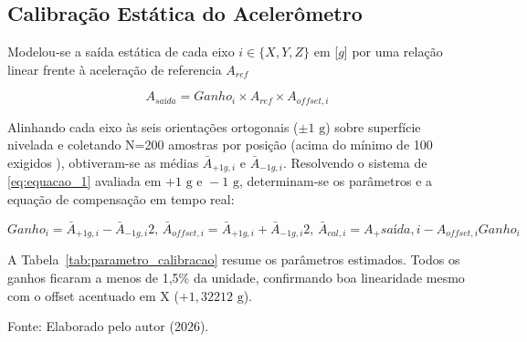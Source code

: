 
\subsection{Calibração Estática do Acelerômetro}
Modelou-se a saída estática de cada eixo $i \in \{X, Y, Z\}$ em [$g$] por uma relação linear frente à aceleração de referencia $A_{ref}$ \cite{4.ochoa2026}

\begin{equation}
    A_{saída} = Ganho_i \times A_{ref} \times A_{offset,i}
    \label{eq:equacao_1}
\end{equation}

Alinhando cada eixo às seis orientações ortogonais ($\pm 1 \text{ g}$) sobre superfície nivelada e coletando N=200 amostras por posição (acima do mínimo de 100 exigidos \cite{4.ochoa2026}), obtiveram-se as médias $\bar{A}_{+1g,i} \text{ e } \bar{A}_{-1g,i}$. Resolvendo o sistema de \ref{eq:equacao_1} avaliada em $+1 \text{ g e } -1 \text{ g}$, determinam-se os parâmetros e a equação de compensação em tempo real:

\begin{equation}
    Ganho_i = \bar{A}_{+1g,i} - \bar{A}_{-1g,i}2 \text{, } \bar{A}_{offset,i} = \bar{A}_{+1g,i} + \bar{A}_{-1g,i}2 \text{, } \bar{A}_{cal,i} = A_+{saída,i} - A_{offset,i}Ganho_i
    \label{eq:equacao_2}
\end{equation}

A Tabela~\ref{tab:parametro_calibracao} resume os parâmetros estimados. Todos os ganhos ficaram a menos de 1,5\% da unidade, confirmando boa linearidade mesmo com o  offset acentuado em X ($+1,32212 \text{ g}$). 


\begin{table}[htbp]
    \centering
    \caption{Parâmetros de Calibração Estática do MPU-6050 (Escala $\pm4 \text{ g, }N = 200$ Amostras/Posição)}
    \label{tab:parametro_calibracao}
    
    
    \vspace{0.2cm}
    
    \raggedright
    \footnotesize
    Fonte: Elaborado pelo autor (2026).
\end{table}

